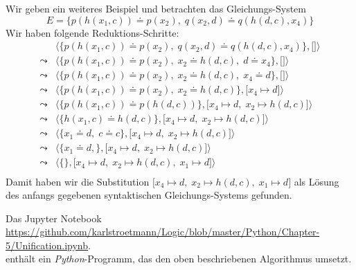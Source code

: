 \example
Wir geben ein weiteres Beispiel und betrachten das Gleichungs-System 
\[ E = \big\{ p(h(x_1,c)) \doteq p(x_2),\; q(x_2, d) \doteq q(h(d,c),x_4) \big\} \]
Wir haben folgende Reduktions-Schritte:
$$
\begin{array}{ll}
          & \big\langle \big\{ p(h(x_1,c)) \doteq p(x_2),\; q(x_2, d) \doteq q(h(d,c),x_4) \big\}, \big[ \big] \big\rangle \\[0.2cm]
 \leadsto & \big\langle \big\{ p(h(x_1,c)) \doteq p(x_2),\; x_2 \doteq h(d,c), \; d \doteq x_4 \big\}, \big[ \big] \big\rangle \\[0.2cm]
 \leadsto & \big\langle \big\{ p(h(x_1,c)) \doteq p(x_2),\; x_2 \doteq h(d,c), \; x_4 \doteq d \big\}, \big[ \big] \big\rangle \\[0.2cm]
 \leadsto & \big\langle \big\{ p(h(x_1,c)) \doteq p(x_2),\; x_2 \doteq h(d,c) \big\}, \big[ x_4 \mapsto d \big] \big\rangle \\[0.2cm]
 \leadsto & \big\langle \big\{ p(h(x_1,c)) \doteq p(h(d,c)) \big\}, \big[ x_4 \mapsto d,\; x_2 \mapsto h(d,c) \big] \big\rangle \\[0.2cm]
 \leadsto & \big\langle \big\{ h(x_1,c) \doteq h(d,c) \big\}, \big[ x_4 \mapsto d,\; x_2 \mapsto h(d,c) \big] \big\rangle \\[0.2cm]
 \leadsto & \big\langle \big\{ x_1 \doteq d,\; c \doteq c \big\}, \big[ x_4 \mapsto d,\; x_2 \mapsto h(d,c) \big] \big\rangle \\[0.2cm]
 \leadsto & \big\langle \big\{ x_1 \doteq d,\big\}, \big[ x_4 \mapsto d,\; x_2 \mapsto h(d,c) \big] \big\rangle \\[0.2cm]
 \leadsto & \big\langle \big\{\big\}, \big[ x_4 \mapsto d,\; x_2 \mapsto h(d,c),\; x_1 \mapsto d \big] \big\rangle \\[0.2cm]
\end{array}
$$
Damit haben wir die Substitution  $\big[ x_4 \mapsto d,\; x_2 \mapsto h(d,c),\; x_1 \mapsto d \big]$ als Lösung 
des anfangs gegebenen syn\-tak\-tischen Gleichungs-Systems gefunden.  
\eox

\noindent
Das Jupyter Notebook
\\[0.2cm]
\hspace*{0.8cm}
\href{https://github.com/karlstroetmann/Logic/blob/master/Python/Chapter-5/Unification.ipynb}{https://github.com/karlstroetmann/Logic/blob/master/Python/Chapter-5/Unification.ipynb}.
\\[0.2cm]
enthält ein \textsl{Python}-Programm, das den oben beschriebenen Algorithmus umsetzt.


